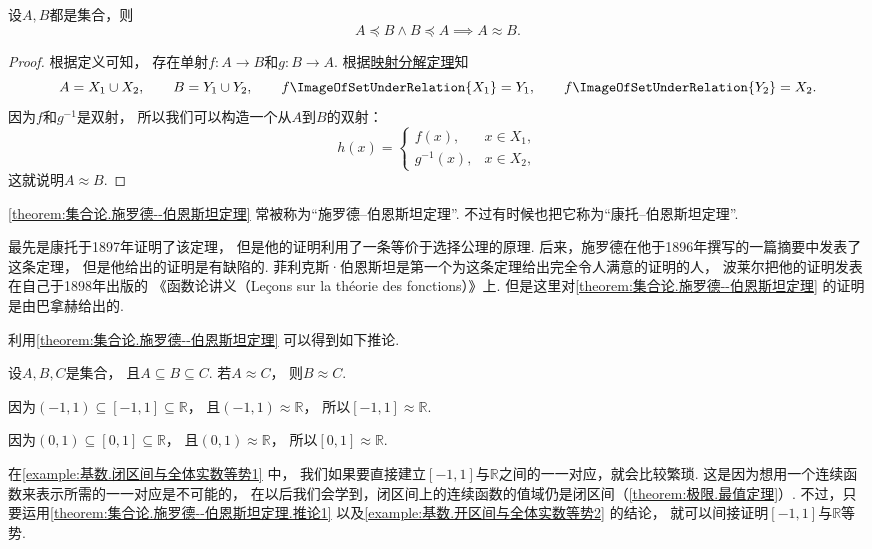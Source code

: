 \begin{theorem}\label{theorem:集合论.施罗德--伯恩斯坦定理}
设\(A,B\)都是集合，则\[
	A \preceq B \land B \preceq A \implies A \approx B.
\]
\begin{proof}
根据定义可知，
存在单射\(f\colon A \to B\)和\(g\colon B \to A\).
根据\hyperref[theorem:基数.集合在映射下的分解]{映射分解定理}知\[
	A = X_1 \cup X_2, \qquad
	B = Y_1 \cup Y_2, \qquad
	f\ImageOfSetUnderRelation{X_1} = Y_1, \qquad
	f\ImageOfSetUnderRelation{Y_2} = X_2.
\]
因为\(f\)和\(g^{-1}\)是双射，
所以我们可以构造一个从\(A\)到\(B\)的双射：\[
	h(x) = \left\{ \begin{array}{cl}
		f(x), & x \in X_1, \\
		g^{-1}(x), & x \in X_2,
	\end{array} \right.
\]
这就说明\(A \approx B\).
\end{proof}
\end{theorem}
\cref{theorem:集合论.施罗德--伯恩斯坦定理}
常被称为“施罗德--伯恩斯坦定理”.
不过有时候也把它称为“康托--伯恩斯坦定理”.

最先是康托于1897年证明了该定理，
但是他的证明利用了一条等价于选择公理的原理.
后来，施罗德在他于1896年撰写的一篇摘要中发表了这条定理，
但是他给出的证明是有缺陷的.
菲利克斯·伯恩斯坦是第一个为这条定理给出完全令人满意的证明的人，
波莱尔把他的证明发表在自己于1898年出版的
《函数论讲义（Le\c{c}ons sur la th\'eorie des fonctions）》上.
但是这里对\cref{theorem:集合论.施罗德--伯恩斯坦定理} 的证明是由巴拿赫给出的.

利用\cref{theorem:集合论.施罗德--伯恩斯坦定理} 可以得到如下推论.
\begin{corollary}\label{theorem:集合论.施罗德--伯恩斯坦定理.推论1}
设\(A,B,C\)是集合，
且\(A \subseteq B \subseteq C\).
若\(A \approx C\)，
则\(B \approx C\).
\end{corollary}

\begin{example}\label{example:基数.闭区间与全体实数等势1}
因为\((-1,1)\subseteq[-1,1]\subseteq\mathbb{R}\)，
且\((-1,1)\approx\mathbb{R}\)，
所以\([-1,1]\approx\mathbb{R}\).

因为\((0,1)\subseteq[0,1]\subseteq\mathbb{R}\)，
且\((0,1)\approx\mathbb{R}\)，
所以\([0,1]\approx\mathbb{R}\).
\end{example}
在\cref{example:基数.闭区间与全体实数等势1} 中，
我们如果要直接建立\([-1,1]\)与\(\mathbb{R}\)之间的一一对应，就会比较繁琐.
这是因为想用一个连续函数来表示所需的一一对应是不可能的，
在以后我们会学到，闭区间上的连续函数的值域仍是闭区间（\cref{theorem:极限.最值定理}）.
不过，只要运用\cref{theorem:集合论.施罗德--伯恩斯坦定理.推论1}
以及\cref{example:基数.开区间与全体实数等势2} 的结论，
就可以间接证明\([-1,1]\)与\(\mathbb{R}\)等势.

